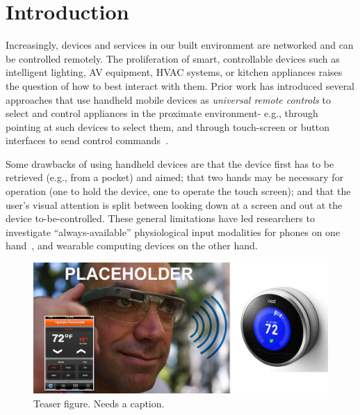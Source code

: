 \section{Introduction}
Increasingly, devices and services in our built environment are networked and can be controlled remotely. The proliferation of smart, controllable devices such as intelligent lighting, AV equipment, HVAC systems, or kitchen appliances raises the question of how to best interact with them. Prior work has introduced several approaches that use handheld mobile devices as {\em universal remote controls} to select and control appliances in the proximate environment- e.g., through pointing at such devices to select them, and through touch-screen or button interfaces to send control commands~\cite{beigl_point_1999,patel_2-way_2003}.

Some drawbacks of using handheld devices are that the device first has to be retrieved (e.g., from a pocket) and aimed; that two hands may be necessary for operation (one to hold the device, one to operate the touch screen); and that the user's visual attention is split between looking down at a screen and out at the device to-be-controlled.   These general limitations have led researchers to investigate ``always-available'' physiological input modalities for phones on one hand~\cite{morris_emerging_2011}, and wearable computing devices on the other hand.

\begin{figure}[t]
\centering
\includegraphics[width=1.0\columnwidth]{figures/teaser}
\caption{Teaser figure. Needs a caption.}
\label{fig:teaser}
\end{figure}

